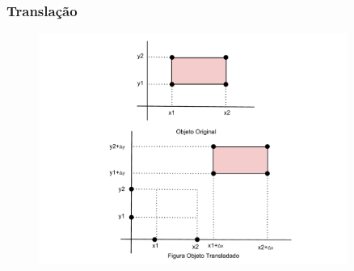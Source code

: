 \documentclass[fleqn]{beamer}
\begin{document}
\begin{frame}
\frametitle{Translação}
	\begin{figure}[!h]
			\begin{center}
			\includegraphics[width=0.9\textwidth]{Figures/Translacao}
			\end{center}
	\end{figure}	
	
\end{frame}
\end{document}
